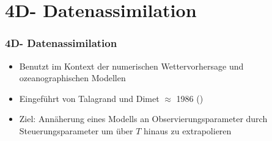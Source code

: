 \section[Problemstellung]{4D- Datenassimilation}
\begin{frame}[<+->]
\frametitle{4D- Datenassimilation}
    \begin{itemize}
     \item Benutzt im Kontext der numerischen Wettervorhersage und ozeanographischen Modellen
     \item Eingeführt von Talagrand und Dimet $\approx$ 1986 (\cite{dimet1986variational})
     \item Ziel: Annäherung eines Modells an Observierungsparameter durch Steuerungsparameter um über $T$ hinaus zu extrapolieren
    \end{itemize}

\end{frame}

